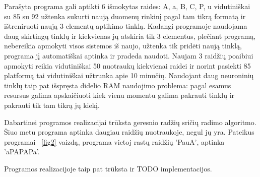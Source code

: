 \documentclass[conference]{IEEEtran}
\begin{document}
Parašyta programa gali aptikti 6 išmokytas raides: A, a, B, C, P, u vidutiniškai su
85%
su 92%
užtenka sukurti naują duomenų rinkinį pagal tam tikrą formatą ir ištreniruoti naują
3 elementų aptikimo tinklą. Kadangi programoje naudojama daug skirtingų tinklų ir kiekvienas
jų atskiria tik 3 elementus, plečiant programą, nebereikia apmokyti visos sistemos iš naujo,
užtenka tik pridėti naują tinklą, programa jį automatiškai aptinka ir pradeda naudoti.
Naujam 3 raidžių poaibiui apmokyti reikia vidutiniškai 50 nuotraukų kiekvienai raidei ir
norint pasiekti 85%
platformą tai vidutiniškai užtrunka apie 10 minučių. Naudojant daug neuroninių tinklų
taip pat išspręsta didelio RAM naudojimo problema: pagal esamus resursus galima
apskaičiuoti kiek vienu momentu galima pakrauti tinklų ir pakrauti tik tam tikrą jų
kiekį.
\par
Dabartinei programos realizacijai trūksta geresnio radžių sričių radimo algoritmo.
Šiuo metu programa aptinka daugiau raidžių nuotraukoje, negul jų yra. Pateikus
programai ~\ref{fig2} vaizdą, programa vietoj rastų raidžių 'PauA', aptinka 'aPAPAPa'.
\par
Programos realizacijoje taip pat trūksta ir TODO implementacijos.
\end{document}
